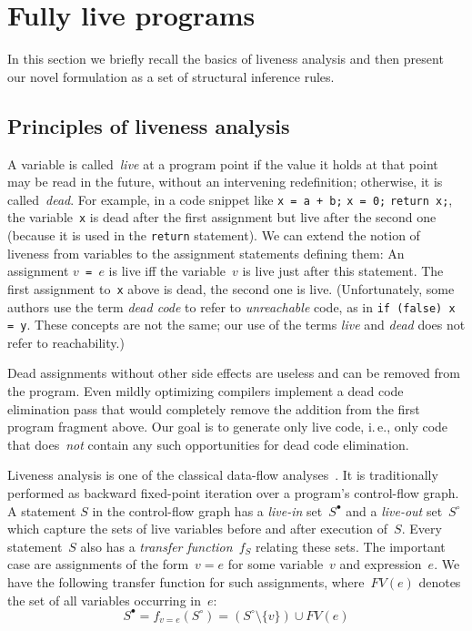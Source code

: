 \documentclass{llncs}
\newcommand{\liveout}[1]{\ensuremath{#1^{\circ}}}
\newcommand{\livein}[1]{\ensuremath{#1^{\bullet}}}
\def\union{\cup}
\begin{document}
\section{Fully live programs}

In this section we briefly recall the basics of liveness analysis and then
present our novel formulation as a set of structural inference rules.

\subsection{Principles of liveness analysis}

A variable is called~\emph{live} at a program point if the value it holds at
that point may be read in the future, without an intervening redefinition;
otherwise, it is called~\emph{dead}.
For example, in a code snippet like \verb|x = a + b;| \verb|x = 0;|
\verb|return x;|, the variable~\verb|x| is dead after the first assignment
but live after the second one (because it is used in the \verb|return|
statement). We can extend the notion of liveness from variables to the
assignment statements defining them: An assignment \(v\)\verb| = |\(e\) is
live iff the variable~\(v\) is live just after this statement. The
first assignment to~\verb|x| above is dead, the second one is live.
(Unfortunately, some authors
use the term \emph{dead code} to refer to \emph{unreachable} code, as in
\texttt{if (false) x = y}. These concepts are not the same; our use of the
terms \emph{live} and \emph{dead} does not refer to reachability.)

Dead assignments without other side effects are useless and can be removed
from the program. Even mildly optimizing compilers implement a dead code
elimination pass that would completely remove the addition from the first
program fragment above. Our goal is to generate only live code, i.\,e., only
code that does~\emph{not} contain any such opportunities for dead code
elimination.

Liveness analysis is one of the classical data-flow
analyses~\cite{nielson.etal-1999}. It is traditionally performed as backward
fixed-point iteration over a program's control-flow graph. A statement \(S\)
in the control-flow graph has a \emph{live-in} set~\(\livein{S}\) and a
\emph{live-out} set~\(\liveout{S}\) which capture the sets of live variables
before and after execution of~\(S\). Every statement~\(S\) also has a
\emph{transfer function}~\(f_S\) relating these sets. The important case are
assignments of the form~\(v = e\) for some variable~\(v\) and
expression~\(e\). We have the following transfer function for such
assignments, where~\(FV(e)\) denotes the set of all variables occurring
in~\(e\):
\[
\livein{S} = f_{v = e}(\liveout{S})
           = (\liveout{S} \setminus \{v\}) \union FV(e)
\]
\end{document}
